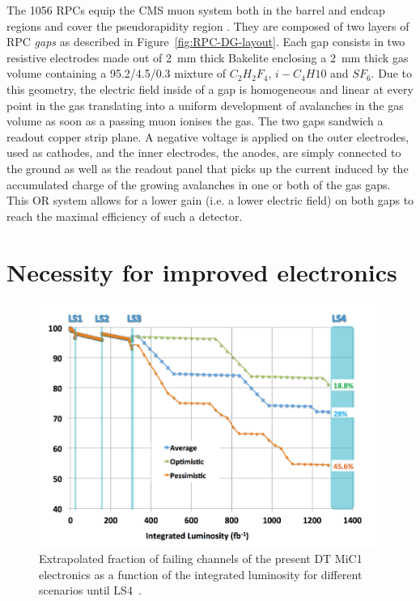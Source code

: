 	The 1056 RPCs equip the CMS muon system both in the barrel and endcap regions and cover the pseudorapidity region . They are composed of two layers of RPC \textit{gaps} as described in Figure~\ref{fig:RPC-DG-layout}. Each gap consists in two resistive electrodes made out of \SI{2}{mm} thick Bakelite enclosing a \SI{2}{mm} thick gas volume containing a 95.2/4.5/0.3 mixture of $C_2H_2F_4$, $i-C_4H10$ and $SF_6$. Due to this geometry, the electric field inside of a gap is homogeneous and linear at every point in the gas translating into a uniform development of avalanches in the gas volume as soon as a passing muon ionises the gas. The two gaps sandwich a readout copper strip plane. A negative voltage is applied on the outer electrodes, used as cathodes, and the inner electrodes, the anodes, are simply connected to the ground as well as the readout panel that picks up the current induced by the accumulated charge of the growing avalanches in one or both of the gas gaps. This OR system allows for a lower gain (i.e. a lower electric field) on both gaps to reach the maximal efficiency of such a detector.
	
\endgroup
	
\section{Necessity for improved electronics}
\label{chapt3:sec:electronics}

\begingroup\setlength{\intextsep}{0pt}\setlength{\columnsep}{15pt}

	\begin{figure}
		\centering
		\includegraphics[width=\linewidth]{fig/chapt3/DT-channel-failure.png}
		\caption{\label{fig:DT-failure} Extrapolated fraction of failing channels of the present DT MiC1 electronics as a function of the integrated luminosity for different scenarios until LS4~\cite{PHASEIITP}.}
	\end{figure}

